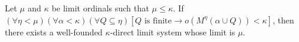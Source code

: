 Let $\mu$ and $\kappa$ be limit ordinals such that $\mu \leq \kappa$. If $(\forall \eta < \mu) (\forall \alpha < \kappa) (\forall Q \subseteq \eta) [Q \text{ is finite} \rightarrow o(M^\eta(\alpha \cup Q)) < \kappa]$, then there exists a well-founded $\kappa$-direct limit system whose limit is $\mu$.
